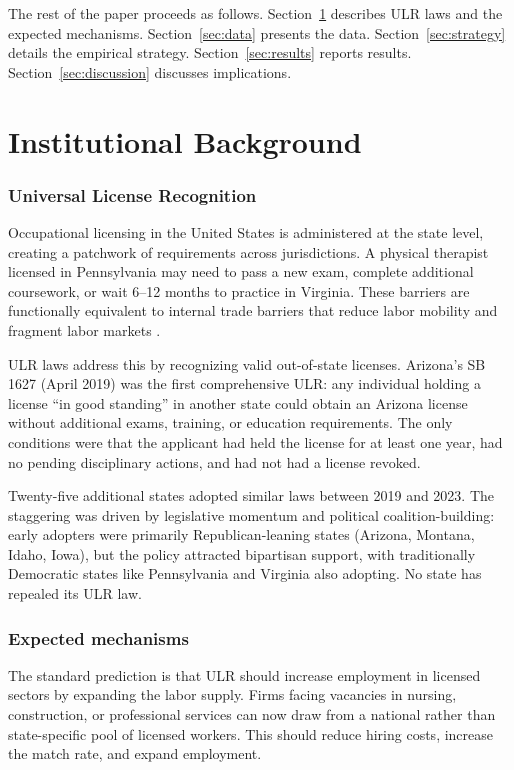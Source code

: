 \documentclass[12pt]{article}
\begin{document}
The rest of the paper proceeds as follows. Section~\ref{sec:background} describes ULR laws and the expected mechanisms. Section~\ref{sec:data} presents the data. Section~\ref{sec:strategy} details the empirical strategy. Section~\ref{sec:results} reports results. Section~\ref{sec:discussion} discusses implications.


\section{Institutional Background}
\label{sec:background}

\subsubsection*{Universal License Recognition} Occupational licensing in the United States is administered at the state level, creating a patchwork of requirements across jurisdictions. A physical therapist licensed in Pennsylvania may need to pass a new exam, complete additional coursework, or wait 6--12 months to practice in Virginia. These barriers are functionally equivalent to internal trade barriers that reduce labor mobility and fragment labor markets \citep{KleinerKrueger2013}.

ULR laws address this by recognizing valid out-of-state licenses. Arizona's SB 1627 (April 2019) was the first comprehensive ULR: any individual holding a license ``in good standing'' in another state could obtain an Arizona license without additional exams, training, or education requirements. The only conditions were that the applicant had held the license for at least one year, had no pending disciplinary actions, and had not had a license revoked.

Twenty-five additional states adopted similar laws between 2019 and 2023. The staggering was driven by legislative momentum and political coalition-building: early adopters were primarily Republican-leaning states (Arizona, Montana, Idaho, Iowa), but the policy attracted bipartisan support, with traditionally Democratic states like Pennsylvania and Virginia also adopting. No state has repealed its ULR law.

\subsubsection*{Expected mechanisms} The standard prediction is that ULR should increase employment in licensed sectors by expanding the labor supply. Firms facing vacancies in nursing, construction, or professional services can now draw from a national rather than state-specific pool of licensed workers. This should reduce hiring costs, increase the match rate, and expand employment.
\end{document}
